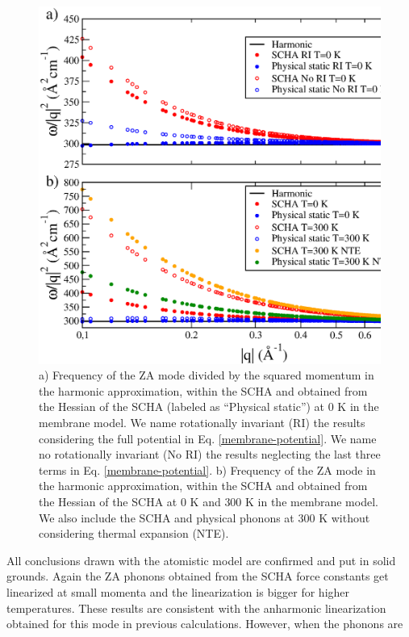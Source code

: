 \begin{figure}[h]
\includegraphics[width=\linewidth]{Figures/membrane.eps}
\caption[ZA harmonic and anharmonic phonons in the membrane model.]{a) Frequency of the ZA mode divided by the 
	squared momentum in the harmonic approximation, within the SCHA and obtained from the Hessian of the SCHA 
	(labeled as ``Physical static'') at 0 K in 
	the membrane model. We name rotationally invariant (RI) the results considering the full potential in 
	Eq. \ref{membrane-potential}. We name no rotationally invariant (No RI) the results neglecting the last three 
	terms in Eq. \ref{membrane-potential}. b) Frequency of the ZA mode in the harmonic approximation, within the 
	SCHA and obtained from the Hessian of the SCHA at $0$ K and $300$ K in the membrane model. We also include 
	the SCHA and physical phonons at $300$ K without considering thermal expansion (NTE).}
\label{membrane-results}
\end{figure}
All conclusions drawn with the atomistic model are confirmed and put in solid grounds. Again the ZA phonons obtained 
from the SCHA force constants get linearized at small momenta and the linearization is bigger for higher 
temperatures. These results are consistent with the anharmonic linearization obtained for this mode in previous 
calculations\cite{mariani2008flexural,amorim2014thermodynamics,de2012bending}. However, when the phonons are 

